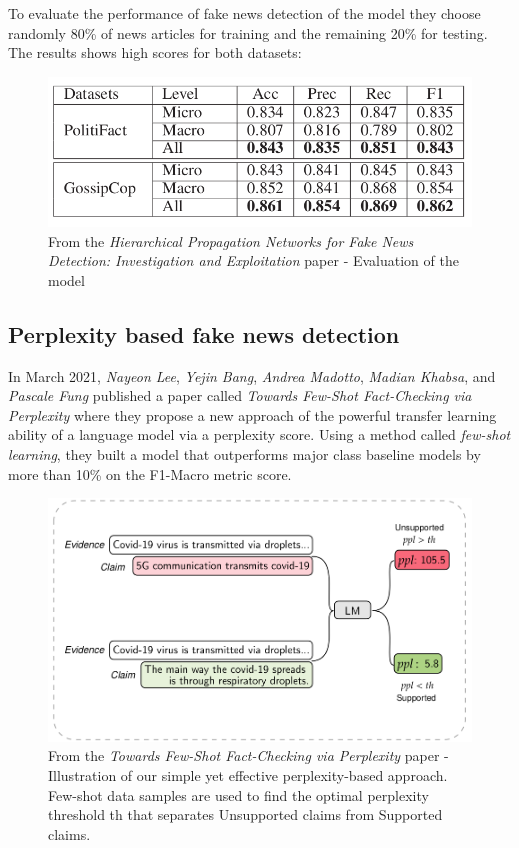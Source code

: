 \documentclass[10pt, english]{report}
\begin{document}
To evaluate the performance of fake news detection of the model they choose randomly 80\% of news articles for training and the remaining 20\% for testing. The results shows high scores for both datasets:

\begin{figure}[H]
	\centering
	\includegraphics[scale=0.4]{img/hierarchical_evaluation_results.png}
	\caption{From the \textit{Hierarchical Propagation Networks for Fake News Detection: Investigation and Exploitation} paper - Evaluation of the model}
\end{figure}


\subsection{Perplexity based fake news detection \cite{lee2021towards}}
In March 2021, \textit{Nayeon Lee}, \textit{Yejin Bang}, \textit{Andrea Madotto}, \textit{Madian Khabsa}, and \textit{Pascale Fung} published a paper called \textit{Towards Few-Shot Fact-Checking via Perplexity} where they propose a new approach of the powerful transfer learning ability of a language model via a perplexity score. Using a method called \textit{few-shot learning}, they built a model that outperforms major class baseline models by more than 10\% on the F1-Macro metric score.\\

\begin{figure}[H]
	\centering
	\includegraphics[scale=0.3]{img/perplexity_example.png}
	\caption{From the \textit{Towards Few-Shot Fact-Checking via Perplexity} paper - Illustration of our simple yet effective perplexity-based approach. Few-shot data samples are used to find the optimal perplexity threshold th that separates Unsupported claims from Supported claims.}
\end{figure}
\end{document}
